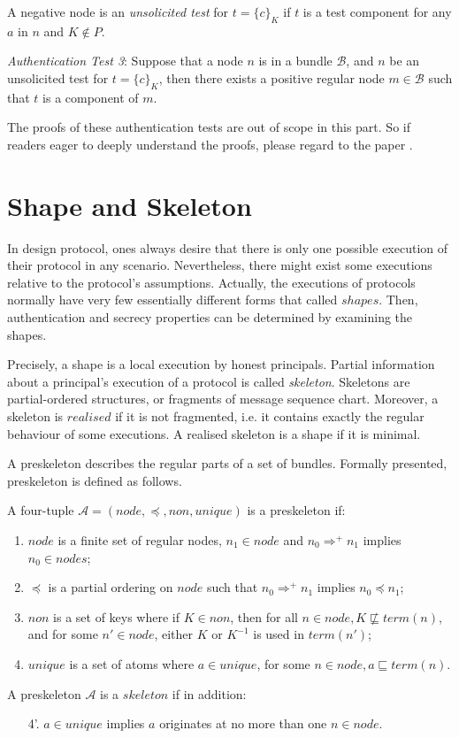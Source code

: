 \begin{Definition} 
A negative node is an \emph{unsolicited test} for $t = \{c\}_K$ if $t$ is a test component for any $a$ in $n$ and $K \not\in P$. 
\end{Definition}

\emph{Authentication Test 3}: Suppose that a node $n$ is in a bundle $\mathcal{B}$, and $n$ be an unsolicited test for $t = \{c\}_K$, then there exists a positive regular node $m \in \mathcal{B}$ such that $t$ is a component of $m$. 
 
The proofs of these authentication tests are out of scope in this part. So if readers eager to deeply understand the proofs, please regard to the paper \cite{Guttman:2002:ATS:568264.568267}.


\section{Shape and Skeleton}

In design protocol, ones always desire that there is only one possible execution of their protocol in any scenario. Nevertheless, there might exist some executions relative to the protocol's assumptions. Actually, the executions of protocols normally have very few essentially different forms that called $shapes$. Then, authentication and secrecy properties can be determined by examining the shapes.

Precisely, a shape is a local execution by honest principals. Partial information about a principal's execution of a protocol is called \emph{skeleton}. Skeletons are partial-ordered structures, or fragments of message sequence chart. Moreover, a skeleton is $realised$ if it is not fragmented, i.e. it contains exactly the regular behaviour of some executions. A realised skeleton is a shape if it is minimal. 

A preskeleton describes the regular parts of a set of bundles. Formally presented, preskeleton is defined as follows.
\begin{Definition}[Skeleton]A four-tuple $\mathcal{A} = (node, \preceq, non, unique)$ is a preskeleton if:
	\begin{enumerate}
	\item $node$ is a finite set of regular nodes, $n_1 \in node$ and $n_0 \Rightarrow^+ n_1$ implies $n_0 \in nodes$;
	\item $\preceq$ is a partial ordering on $node$ such that $n_0 \Rightarrow^+ n_1$ implies $n_0 \preceq n_1$;
	\item $non$ is a set of keys where if $K \in non$, then for all $n \in node, K\not\sqsubseteq term(n)$, and for some $n' \in node$, either $K$ or $K^{-1}$ is used in $term(n')$;
	\item $unique$ is a set of atoms where $a \in unique$, for some $n \in node, a \sqsubseteq term(n)$. 
	\end{enumerate}
	A preskeleton $\mathcal{A}$ is a $skeleton$ if in addition:
	\begin{enumerate}
	\item[4'.] $a\in unique$ implies $a$ originates at no more than one $n\in node$. 
	\end{enumerate}
\end{Definition}

